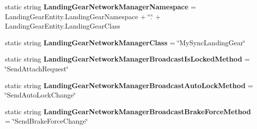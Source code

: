 \begin{DoxyCompactItemize}
\item 
\hypertarget{class_s_e_mod_a_p_i_internal_1_1_a_p_i_1_1_entity_1_1_sector_1_1_sector_object_1_1_cube_grid_1_154fcaee477cbc43ff04e45ff5a3afe74_a7252d27e94d9061de3a7cef911bfce06}{}static string {\bfseries Landing\+Gear\+Network\+Manager\+Namespace} = Landing\+Gear\+Entity.\+Landing\+Gear\+Namespace + \char`\"{}.\char`\"{} + Landing\+Gear\+Entity.\+Landing\+Gear\+Class\label{class_s_e_mod_a_p_i_internal_1_1_a_p_i_1_1_entity_1_1_sector_1_1_sector_object_1_1_cube_grid_1_154fcaee477cbc43ff04e45ff5a3afe74_a7252d27e94d9061de3a7cef911bfce06}

\item 
\hypertarget{class_s_e_mod_a_p_i_internal_1_1_a_p_i_1_1_entity_1_1_sector_1_1_sector_object_1_1_cube_grid_1_154fcaee477cbc43ff04e45ff5a3afe74_a72859aea85d6e51136bbb09282b422d9}{}static string {\bfseries Landing\+Gear\+Network\+Manager\+Class} = \char`\"{}My\+Sync\+Landing\+Gear\char`\"{}\label{class_s_e_mod_a_p_i_internal_1_1_a_p_i_1_1_entity_1_1_sector_1_1_sector_object_1_1_cube_grid_1_154fcaee477cbc43ff04e45ff5a3afe74_a72859aea85d6e51136bbb09282b422d9}

\item 
\hypertarget{class_s_e_mod_a_p_i_internal_1_1_a_p_i_1_1_entity_1_1_sector_1_1_sector_object_1_1_cube_grid_1_154fcaee477cbc43ff04e45ff5a3afe74_a4faef726b14c4e3620345f4ba2797e27}{}static string {\bfseries Landing\+Gear\+Network\+Manager\+Broadcast\+Is\+Locked\+Method} = \char`\"{}Send\+Attach\+Request\char`\"{}\label{class_s_e_mod_a_p_i_internal_1_1_a_p_i_1_1_entity_1_1_sector_1_1_sector_object_1_1_cube_grid_1_154fcaee477cbc43ff04e45ff5a3afe74_a4faef726b14c4e3620345f4ba2797e27}

\item 
\hypertarget{class_s_e_mod_a_p_i_internal_1_1_a_p_i_1_1_entity_1_1_sector_1_1_sector_object_1_1_cube_grid_1_154fcaee477cbc43ff04e45ff5a3afe74_abd41877b220df5d4f4e0efadcf55376b}{}static string {\bfseries Landing\+Gear\+Network\+Manager\+Broadcast\+Auto\+Lock\+Method} = \char`\"{}Send\+Auto\+Lock\+Change\char`\"{}\label{class_s_e_mod_a_p_i_internal_1_1_a_p_i_1_1_entity_1_1_sector_1_1_sector_object_1_1_cube_grid_1_154fcaee477cbc43ff04e45ff5a3afe74_abd41877b220df5d4f4e0efadcf55376b}

\item 
\hypertarget{class_s_e_mod_a_p_i_internal_1_1_a_p_i_1_1_entity_1_1_sector_1_1_sector_object_1_1_cube_grid_1_154fcaee477cbc43ff04e45ff5a3afe74_ac2ebc074fd3fc685596395876178e6d9}{}static string {\bfseries Landing\+Gear\+Network\+Manager\+Broadcast\+Brake\+Force\+Method} = \char`\"{}Send\+Brake\+Force\+Change\char`\"{}\label{class_s_e_mod_a_p_i_internal_1_1_a_p_i_1_1_entity_1_1_sector_1_1_sector_object_1_1_cube_grid_1_154fcaee477cbc43ff04e45ff5a3afe74_ac2ebc074fd3fc685596395876178e6d9}

\end{DoxyCompactItemize}
